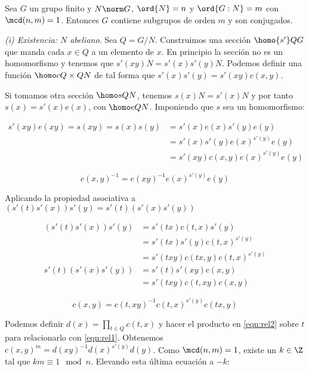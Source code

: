 
\begin{teorema} Sea $G$ un grupo finito y $N\norm G$, $\ord{N}=n$ y $\ord{G:N}=m$ con $\mcd(n,m)=1$. Entonces $G$ contiene subgrupos de orden $m$ y son conjugados.
	\begin{demostracion}
		\textit{(i) Existencia: $N$ abeliano}. Sea $Q = G/N$. Construimos una sección $\homo {s'} Q G$ que manda cada $x\in Q$ a un elemento de $x$. En principio la sección no es un homomorfismo y tenemos que $s'(xy)N = s'(x)s'(y)N$. Podemos definir una función $\homo c{Q\times Q}N$ de tal forma que $s'(x)s'(y) =s'(xy)c(x,y)$.
		
		 Si tomamos otra sección $\homo s Q N$, tenemos $s(x)N = s'(x)N$ y por tanto $s(x)=s'(x)e(x)$, con $\homo e Q N$. Imponiendo que $s$ sea un homomorfismo:
		 
		 \begin{align*}
		 	s'(xy)e(xy) = s(xy) = s(x)s(y) &= s'(x)e(x)s'(y)e(y) \\ &= s'(x)s'(y)e(x)^{s'(y)}e(y) \\ &= s'(xy)c(x,y)e(x)^{s'(y)}e(y)	
		 \end{align*}
		 
		 \begin{equation}\label{eqn:rel1}
		 	c(x,y)^{-1} = e(xy)^{-1}e(x)^{s'(y)}e(y)
		 \end{equation}
		 
		 Aplicando la propiedad asociativa a $(s'(t)s'(x))s'(y) = s'(t)(s'(x)s'(y))$
		 
		  \begin{align*}
		 (s'(t)s'(x))s'(y) &= s'(tx)c(t,x)s'(y) \\ &= s'(tx)s'(y)c(t,x)^{s'(y)}  \\ &= s'(txy)c(tx,y)c(t,x)^{s'(y)} \\
		 s'(t)(s'(x)s'(y)) &= s'(t)s'(xy)c(x,y) \\ &= s'(txy)c(t,xy)c(x,y)
		  \end{align*}
		 
		 \begin{equation}\label{eqn:rel2}
		 	c(x,y) = c(t,xy)^{-1}c(t,x)^{s'(y)}c(tx,y)
		 \end{equation}
		 
		 Podemos definir ${\displaystyle d(x) = \prod_{t\in Q} c(t,x)}$ y hacer el producto en \eqref{eqn:rel2} sobre $t$ para relacionarlo con \eqref{eqn:rel1}. Obtenemos $c(x,y)^{m} = d(xy)^{-1}d(x)^{s'(y)}d(y)$. Como $\mcd(n,m) = 1$, existe un $k\in \Z$ tal que $km\equiv 1 \mod n$. Elevando esta última ecuación a $-k$:
		 

\end{demostracion}
\end{teorema}
